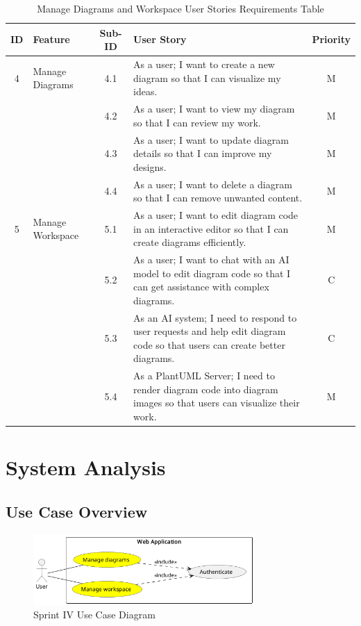 \begin{table}[h]
    \centering
    \begin{tabular}{|c|l|c|p{8cm}|c|}
    \hline
    \textbf{ID} & \textbf{Feature} & \textbf{Sub-ID} & \textbf{User Story} & \textbf{Priority} \\
    \hline
    4 & Manage Diagrams & 4.1 & As a user; I want to create a new diagram so that I can visualize my ideas. & M \\
    \hline
      &  & 4.2 & As a user; I want to view my diagram so that I can review my work. & M \\
    \hline
      &  & 4.3 & As a user; I want to update diagram details so that I can improve my designs. & M \\
    \hline
      &  & 4.4 & As a user; I want to delete a diagram so that I can remove unwanted content. & M \\
    \hline
    5 & Manage Workspace & 5.1 & As a user; I want to edit diagram code in an interactive editor so that I can create diagrams efficiently. & M \\
    \hline
      &  & 5.2 & As a user; I want to chat with an AI model to edit diagram code so that I can get assistance with complex diagrams. & C \\
    \hline
      &  & 5.3 & As an AI system; I need to respond to user requests and help edit diagram code so that users can create better diagrams. & C \\
    \hline
      &  & 5.4 & As a PlantUML Server; I need to render diagram code into diagram images so that users can visualize their work. & M \\
    \hline
    \end{tabular}
    \caption{Manage Diagrams and Workspace User Stories Requirements Table}
    \label{tab:diagrams_workspace}
    \end{table}
\section{System Analysis}

\subsection{Use Case Overview}

\begin{figure}[H]
\centering
\includegraphics[width=0.75\textwidth]{conception/SprintIV/use_case_diagrams/use_case_diagram_of_SprintIV.png}
\caption{Sprint IV Use Case Diagram}
\end{figure}

